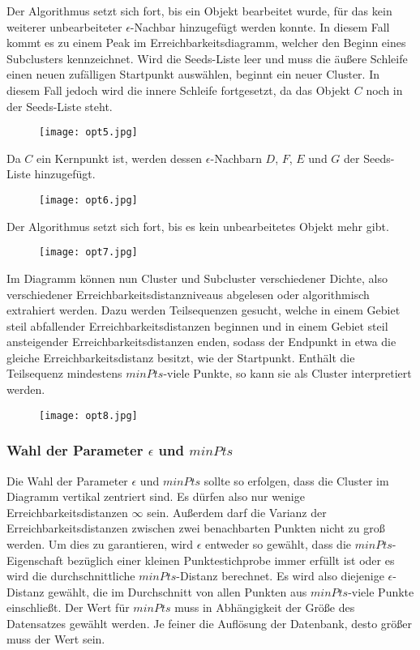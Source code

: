 \documentclass[11pt,ceqn]{book}
\begin{document}
Der Algorithmus setzt sich fort, bis ein Objekt bearbeitet wurde, für das kein weiterer unbearbeiteter $\epsilon$-Nachbar hinzugefügt werden konnte. In diesem Fall kommt es zu einem Peak im Erreichbarkeitsdiagramm, welcher den Beginn eines Subclusters kennzeichnet. Wird die Seeds-Liste leer und muss die äußere Schleife einen neuen zufälligen Startpunkt auswählen, beginnt ein neuer Cluster. 
In diesem Fall jedoch wird die innere Schleife fortgesetzt, da das Objekt $C$ noch in der Seeds-Liste steht.
\begin{figure}[H]
\centering
\texttt{[image: opt5.jpg]}
\end{figure}
Da $C$ ein Kernpunkt ist, werden dessen $\epsilon$-Nachbarn $D$, $F$, $E$ und $G$ der Seeds-Liste hinzugefügt. 
\begin{figure}[H]
\centering
\texttt{[image: opt6.jpg]}
\end{figure}
Der Algorithmus setzt sich fort, bis es kein unbearbeitetes Objekt mehr gibt.
\begin{figure}[H]
\centering
\texttt{[image: opt7.jpg]}
\end{figure}
Im Diagramm können nun Cluster und Subcluster verschiedener Dichte, also verschiedener Erreichbarkeitsdistanzniveaus abgelesen oder algorithmisch extrahiert werden. Dazu werden Teilsequenzen gesucht, welche in einem Gebiet steil abfallender Erreichbarkeitsdistanzen beginnen und in einem Gebiet steil ansteigender Erreichbarkeitsdistanzen enden, sodass der Endpunkt in etwa die gleiche Erreichbarkeitsdistanz besitzt, wie der Startpunkt. Enthält die Teilsequenz mindestens $minPts$-viele Punkte, so kann sie als Cluster interpretiert werden. 
\begin{figure}[H]
\centering
\texttt{[image: opt8.jpg]}
\end{figure}

\subsubsection{Wahl der Parameter $\epsilon$ und $minPts$}
Die Wahl der Parameter $\epsilon$ und $minPts$ sollte so erfolgen, dass die Cluster im Diagramm vertikal zentriert sind. Es dürfen also nur wenige Erreichbarkeitsdistanzen $\infty$ sein. Außerdem darf die Varianz der Erreichbarkeitsdistanzen zwischen zwei benachbarten Punkten nicht zu groß werden. Um dies zu garantieren, wird $\epsilon$ entweder so gewählt, dass die $minPts$-Eigenschaft bezüglich einer kleinen Punktestichprobe immer erfüllt ist oder es wird die durchschnittliche $minPts$-Distanz berechnet. Es wird also diejenige $\epsilon$-Distanz gewählt, die im Durchschnitt von allen Punkten aus $minPts$-viele Punkte einschließt. Der Wert für $minPts$ muss in Abhängigkeit der Größe des Datensatzes gewählt werden. Je feiner die Auflösung der Datenbank, desto größer muss der Wert sein.
\end{document}
